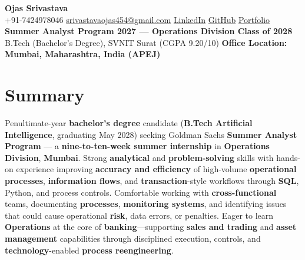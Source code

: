 \documentclass[a4paper,10pt]{article}
\begin{document}
\selectfont

\begin{center}
  {\LARGE \textbf{Ojas Srivastava}} \\[1mm]
  \small
  +91-7424978046 \textbar{}
  \href{mailto:srivastavaojas454@gmail.com}{srivastavaojas454@gmail.com} \textbar{}
  \href{https://linkedin.com/in/ojas-srivastava05}{LinkedIn} \textbar{}
  \href{https://github.com/Ojas-Srivastava05}{GitHub} \textbar{}
  \href{https://ojas-srivastava.vercel.app}{Portfolio} \\[0.5mm]
  \textbf{Summer Analyst Program 2027 --- Operations Division \textbar{} Class of 2028} \\[0.3mm]
  B.Tech (Bachelor's Degree), SVNIT Surat (CGPA 9.20/10) \textbar{}
  \textbf{Office Location: Mumbai, Maharashtra, India (APEJ)}
\end{center}

\vspace{-1mm}

\section{Summary}
\small
Penultimate-year \textbf{bachelor's degree} candidate (\textbf{B.Tech Artificial Intelligence}, graduating May 2028) seeking Goldman Sachs \textbf{Summer Analyst Program} --- a \textbf{nine-to-ten-week summer internship} in \textbf{Operations Division}, \textbf{Mumbai}. Strong \textbf{analytical} and \textbf{problem-solving} skills with hands-on experience improving \textbf{accuracy and efficiency} of high-volume \textbf{operational processes}, \textbf{information flows}, and \textbf{transaction}-style workflows through \textbf{SQL}, Python, and process controls. Comfortable working with \textbf{cross-functional} teams, documenting \textbf{processes}, \textbf{monitoring systems}, and identifying issues that could cause operational \textbf{risk}, data errors, or penalties. Eager to learn \textbf{Operations} at the core of \textbf{banking}---supporting \textbf{sales and trading} and \textbf{asset management} capabilities through disciplined execution, controls, and \textbf{technology}-enabled \textbf{process reengineering}.
\end{document}
